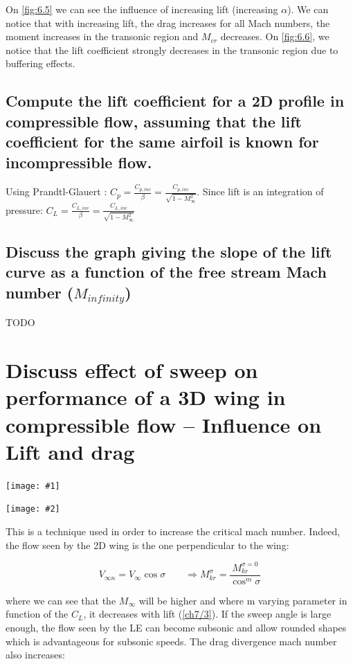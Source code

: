 \documentclass[british,french,11pt, a4paper, openany]{article}
\newcommand{\minifig}[6]{
	\begin{center}%
		\begin{minipage}{#5\textwidth}%
			\texttt{[image: \#1]}%
			\captionof{figure}{}%
			\label{#1}%
		\end{minipage}%
		\begin{minipage}{#6\textwidth}%
			\texttt{[image: \#2]}%
			\captionof{figure}{}%
			\label{#2}%
		\end{minipage}%
	\end{center}
}
\begin{document}
On \autoref{fig:6.5} we can see the influence of increasing lift (increasing $\alpha$). We can notice that with increasing lift, the drag increases for all Mach numbers, the moment increases in the transonic region and $M_{cr}$ decreases. On \autoref{fig:6.6}, we notice that the lift coefficient strongly decreases in the transonic region due to buffering effects. 


\subsection{Compute the lift coefficient for a 2D profile in compressible flow, assuming
	that the lift coefficient for the same airfoil is known for incompressible flow.}
Using Prandtl-Glauert : $C_p = \frac{C_{p,inc}}{\beta} = \frac{C_{p,inc}}{\sqrt{1 - M_\infty ^2}}$. Since lift is an integration of pressure: $C_L = \frac{C_{L,inc}}{\beta} = \frac{C_{L,inc}}{\sqrt{1 - M_\infty ^2}}$


\subsection{Discuss the graph giving the slope of the lift curve as a function of the free
	stream Mach number ($M_{infinity}$)}

TODO

\section{Discuss effect of sweep on performance of a 3D wing in compressible flow -- Influence on Lift and drag}

\minifig{ch7/2}{ch7/3}{0.15}{0.15}{0.3}{0.3}
This is a technique used in order to increase the critical mach number. Indeed, the flow seen by the 2D wing is the one perpendicular to the wing:

\begin{equation}
V_{\infty n} = V_{\infty}\cos \sigma \qquad \Rightarrow M_{kr}^\sigma= \frac{M_{kr}^{\sigma = 0}}{\cos^m \sigma}
\end{equation}

where we can see that the $M_\infty$ will be higher and where m varying parameter in function of the $C_L$, it decreases with lift (\autoref{ch7/3}). If the sweep angle is large enough, the flow seen by the LE can become subsonic and allow rounded shapes which is advantageous for subsonic speeds. The drag divergence mach number also increases:
\end{document}
